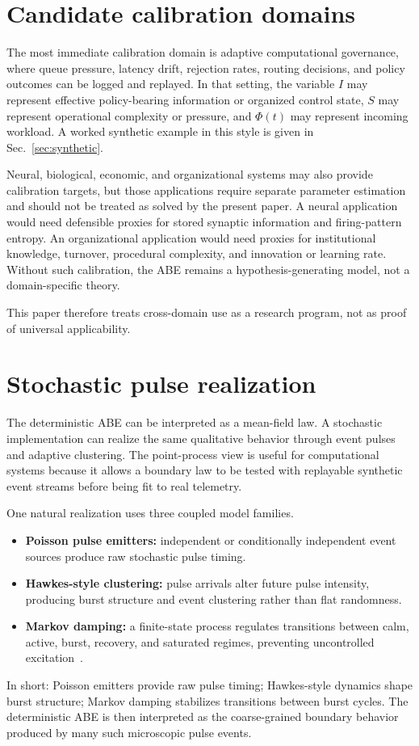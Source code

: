 \documentclass[11pt]{article}
\begin{document}
\section{Candidate calibration domains}
The most immediate calibration domain is adaptive computational governance, where queue pressure, latency drift, rejection rates, routing decisions, and policy outcomes can be logged and replayed. In that setting, the variable $I$ may represent effective policy-bearing information or organized control state, $S$ may represent operational complexity or pressure, and $\Phi(t)$ may represent incoming workload. A worked synthetic example in this style is given in Sec.~\ref{sec:synthetic}.

Neural, biological, economic, and organizational systems may also provide calibration targets, but those applications require separate parameter estimation and should not be treated as solved by the present paper. A neural application would need defensible proxies for stored synaptic information and firing-pattern entropy. An organizational application would need proxies for institutional knowledge, turnover, procedural complexity, and innovation or learning rate. Without such calibration, the ABE remains a hypothesis-generating model, not a domain-specific theory.

This paper therefore treats cross-domain use as a research program, not as proof of universal applicability.

\section{Stochastic pulse realization}
The deterministic ABE can be interpreted as a mean-field law. A stochastic implementation can realize the same qualitative behavior through event pulses and adaptive clustering. The point-process view is useful for computational systems because it allows a boundary law to be tested with replayable synthetic event streams before being fit to real telemetry.

One natural realization uses three coupled model families.
\begin{itemize}
  \item \textbf{Poisson pulse emitters:} independent or conditionally independent event sources produce raw stochastic pulse timing.
  \item \textbf{Hawkes-style clustering:} pulse arrivals alter future pulse intensity, producing burst structure and event clustering rather than flat randomness.
  \item \textbf{Markov damping:} a finite-state process regulates transitions between calm, active, burst, recovery, and saturated regimes, preventing uncontrolled excitation~\cite{norris1997markov,gardiner2009stochastic}.
\end{itemize}
In short: Poisson emitters provide raw pulse timing; Hawkes-style dynamics shape burst structure; Markov damping stabilizes transitions between burst cycles. The deterministic ABE is then interpreted as the coarse-grained boundary behavior produced by many such microscopic pulse events.
\end{document}
